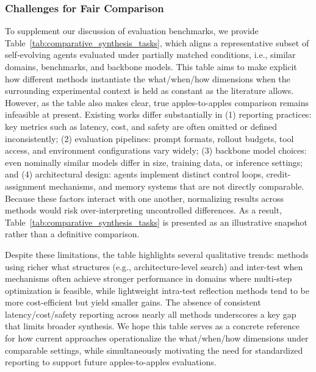 \documentclass[10pt]{article} %
\begin{document}
\subsubsection{Challenges for Fair Comparison}
To supplement our discussion of evaluation benchmarks, we provide Table~\ref{tab:comparative_synthesis_tasks}, which aligns a representative subset of self-evolving agents evaluated under partially matched conditions, i.e., similar domains, benchmarks, and backbone models. This table aims to make explicit how different methods instantiate the what/when/how dimensions when the surrounding experimental context is held as constant as the literature allows. However, as the table also makes clear, true apples-to-apples comparison remains infeasible at present. Existing works differ substantially in (1) reporting practices: key metrics such as latency, cost, and safety are often omitted or defined inconsistently;
(2) evaluation pipelines: prompt formats, rollout budgets, tool access, and environment configurations vary widely;
(3) backbone model choices: even nominally similar models differ in size, training data, or inference settings; and
(4) architectural design: agents implement distinct control loops, credit-assignment mechanisms, and memory systems that are not directly comparable. Because these factors interact with one another, normalizing results across methods would risk over-interpreting uncontrolled differences. As a result, Table~\ref{tab:comparative_synthesis_tasks} is presented as an illustrative snapshot rather than a definitive comparison.

Despite these limitations, the table highlights several qualitative trends: methods using richer what structures (e.g., architecture-level search) and inter-test when mechanisms often achieve stronger performance in domains where multi-step optimization is feasible, while lightweight intra-test reflection methods tend to be more cost-efficient but yield smaller gains. The absence of consistent latency/cost/safety reporting across nearly all methods underscores a key gap that limits broader synthesis. We hope this table serves as a concrete reference for how current approaches operationalize the what/when/how dimensions under comparable settings, while simultaneously motivating the need for standardized reporting to support future apples-to-apples evaluations.
\end{document}
